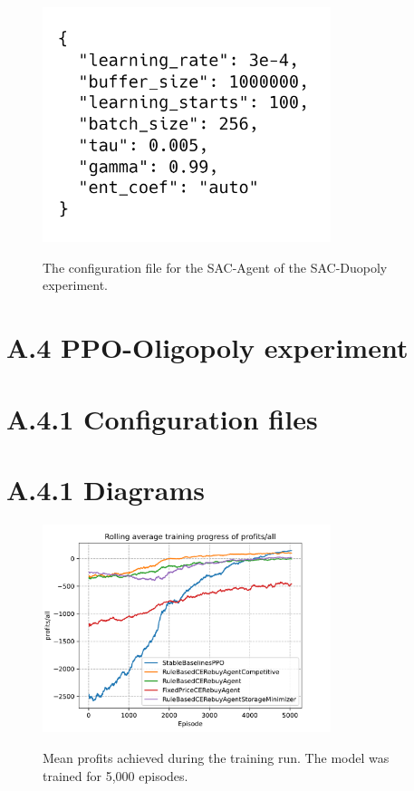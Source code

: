 \begin{figure}[ht]
	\includegraphics[width = 0.75\textwidth]{images/configs/SACDuopolyAgent.png}\\
	\caption{The configuration file for the SAC-Agent of the SAC-Duopoly experiment.}\label{fig:SACDuopolyConfigAgent}
\end{figure}

\clearpage
\section*{A.4 PPO-Oligopoly experiment}\label{sec:AppendixOligopoly}

\section*{A.4.1 Configuration files}

\section*{A.4.1 Diagrams}

\begin{figure}[ht]
	\includegraphics[width = 0.75\textwidth]{images/experiments/PPOOligopoly/LineProfitsAll.pdf}\\
	\caption{Mean profits achieved during the training run. The model was trained for 5,000 episodes.}\label{fig:PPOOligopolyLineProfitsAll}
\end{figure}